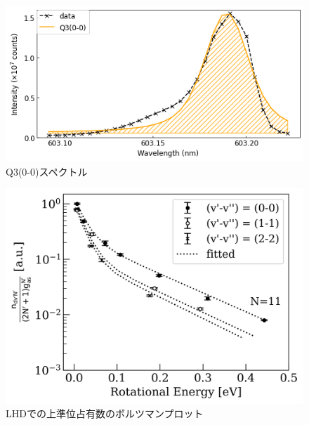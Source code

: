 \begin{figure}
    \centering
    \includegraphics[width=15cm]{pictures/voigt-fitting-3.png}
    \caption{Q3(0-0)スペクトル}
    \label{fig:voigt-fitting-3}
\end{figure}

\begin{figure}
    \centering
    \includegraphics[width=15cm]{pictures/ishihara-upper-boltzmann.png}
    \caption{LHDでの上準位占有数のボルツマンプロット}
    \label{fig:ishihara-upper-boltzmann}
\end{figure}
